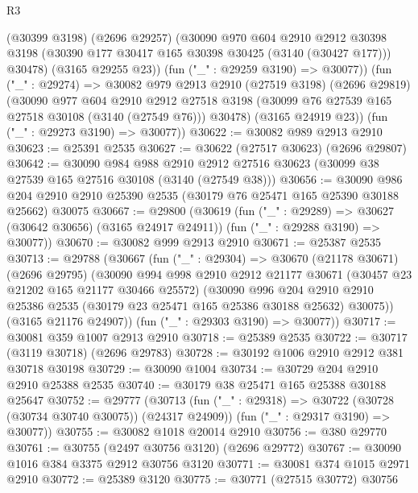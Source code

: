 \begin{lexlean}{R3}
\begin{coremodule}
          (@30399 @3198)
          (@2696 @29257)
          (@30090
            @970
            @604
            @2910
            @2912
            @30398
            @3198
            (@30390 @177 @30417 @165 @30398 @30425 (@3140 (@30427 @177)))
            @30478)
          (@3165 @29255 @23))
        (fun ("_" : @29259 @3190) => @30077))
      (fun ("_" : @29274) =>
      @30082
        @979
        @2913
        @2910
        (@27519 @3198)
        (@2696 @29819)
        (@30090
          @977
          @604
          @2910
          @2912
          @27518
          @3198
          (@30099 @76 @27539 @165 @27518 @30108 (@3140 (@27549 @76)))
          @30478)
        (@3165 @24919 @23))
      (fun ("_" : @29273 @3190) => @30077))
@30622 := @30082 @989 @2913 @2910
@30623 := @25391 @2535
@30627 := @30622 (@27517 @30623) (@2696 @29807)
@30642 := @30090
    @984
    @988
    @2910
    @2912
    @27516
    @30623
    (@30099 @38 @27539 @165 @27516 @30108 (@3140 (@27549 @38)))
@30656 := @30090
    @986
    @204
    @2910
    @2910
    @25390
    @2535
    (@30179 @76 @25471 @165 @25390 @30188 @25662)
    @30075
@30667 := @29800
    (@30619
      (fun ("_" : @29289) => @30627 (@30642 @30656) (@3165 @24917 @24911))
      (fun ("_" : @29288 @3190) => @30077))
@30670 := @30082 @999 @2913 @2910
@30671 := @25387 @2535
@30713 := @29788
    (@30667
      (fun ("_" : @29304) =>
      @30670
        (@21178 @30671)
        (@2696 @29795)
        (@30090
          @994
          @998
          @2910
          @2912
          @21177
          @30671
          (@30457 @23 @21202 @165 @21177 @30466 @25572)
          (@30090
            @996
            @204
            @2910
            @2910
            @25386
            @2535
            (@30179 @23 @25471 @165 @25386 @30188 @25632)
            @30075))
        (@3165 @21176 @24907))
      (fun ("_" : @29303 @3190) => @30077))
@30717 := @30081 @359 @1007 @2913 @2910
@30718 := @25389 @2535
@30722 := @30717 (@3119 @30718) (@2696 @29783)
@30728 := @30192 @1006 @2910 @2912 @381 @30718 @30198
@30729 := @30090 @1004
@30734 := @30729 @204 @2910 @2910 @25388 @2535
@30740 := @30179 @38 @25471 @165 @25388 @30188 @25647
@30752 := @29777
    (@30713
      (fun ("_" : @29318) => @30722 (@30728 (@30734 @30740 @30075)) (@24317 @24909))
      (fun ("_" : @29317 @3190) => @30077))
@30755 := @30082 @1018 @20014 @2910
@30756 := @380 @29770
@30761 := @30755 (@2497 @30756 @3120) (@2696 @29772)
@30767 := @30090 @1016 @384 @3375 @2912 @30756 @3120
@30771 := @30081 @374 @1015 @2971 @2910
@30772 := @25389 @3120
@30775 := @30771 (@27515 @30772) @30756

\end{coremodule}
\end{lexlean}
